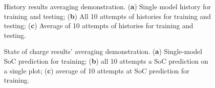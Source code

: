 \begin{figure}[H]
    \begin{subfigure}[b]{0.325\textwidth}
        
        \caption{\centering}
        \label{subfig:Model-DEMO-1}
    \end{subfigure}
    \begin{subfigure}[b]{0.325\textwidth}
        
        \caption{\centering}
        \label{subfig:Model-DEMO-10}
    \end{subfigure}
    \begin{subfigure}[b]{0.325\textwidth}
        
        \caption{\centering}
        \label{subfig:Model-DEMO-avr}
    \end{subfigure}
    \caption{History results averaging demonstration. (\textbf{a}) Single model history for training and testing; (\textbf{b}) All 10 attempts of histories for training and testing; (\textbf{c}) Average of 10 attempts of histories for training and testing.}
    \label{fig:Model-DEMO}
\end{figure}
\begin{figure}[H] %
    \begin{subfigure}[b]{0.325\textwidth}
        
        \caption{\centering}
        \label{subfig:Model-DEMO2-1}
    \end{subfigure}
    \begin{subfigure}[b]{0.325\textwidth}
        
        \caption{\centering}
        \label{subfig:Model-DEMO2-10}
    \end{subfigure}
    \begin{subfigure}[b]{0.325\textwidth}
        
        \caption{\centering}
        \label{subfig:Model-DEMO2-avr}
    \end{subfigure}
    \caption{State of charge results' averaging demonstration. (\textbf{a}) Single-model SoC prediction for training; (\textbf{b}) all 10 attempts a SoC prediction on a single plot; (\textbf{c}) average of 10 attempts at SoC prediction for training.}
    \label{fig:Model-DEMO2}
\end{figure}

